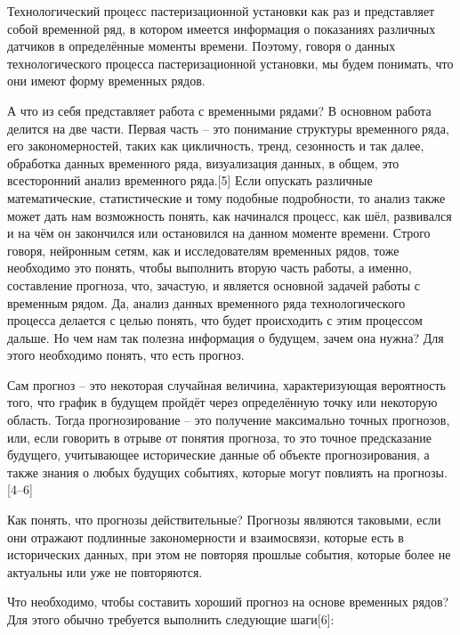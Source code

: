 {  \par \redline Технологический процесс пастеризационной установки как раз и представляет собой временной ряд, в котором имеется информация о показаниях различных датчиков в определённые моменты времени. Поэтому, говоря о данных технологического процесса пастеризационной установки, мы будем понимать, что они имеют форму временных рядов.

  \par \redline А что из себя представляет работа с временными рядами? В основном работа делится на две части. Первая часть {--} это понимание структуры временного ряда, его закономерностей, таких как цикличность, тренд, сезонность и так далее, обработка данных временного ряда, визуализация данных, в общем, это всесторонний анализ временного ряда.[5] Если опускать различные математические, статистические и тому подобные подробности, то анализ также может дать нам возможность понять, как начинался процесс, как шёл, развивался и на чём он закончился или остановился на данном моменте времени.  Строго говоря, нейронным сетям, как и исследователям временных рядов, тоже необходимо это понять, чтобы выполнить вторую часть работы, а именно, составление прогноза, что, зачастую, и является основной задачей работы с временным рядом. Да, анализ данных временного ряда технологического процесса делается с целью понять, что будет происходить с этим процессом дальше. Но чем нам так полезна информация о будущем, зачем она нужна? Для этого необходимо понять, что есть прогноз.

  \par \redline Сам прогноз {--} это некоторая случайная величина, характеризующая вероятность того, что график в будущем пройдёт через определённую точку или некоторую область. Тогда прогнозирование {--} это получение максимально точных прогнозов, или, если говорить в отрыве от понятия прогноза, то это точное предсказание будущего, учитывающее исторические данные об объекте прогнозирования, а также знания о любых будущих событиях, которые могут повлиять на прогнозы.[4{--}6]

  \par \redline Как понять, что прогнозы действительные? Прогнозы являются таковыми, если они отражают подлинные закономерности и взаимосвязи, которые есть в исторических данных, при этом не повторяя прошлые события, которые более не актуальны или уже не повторяются.

  \par \redline Что необходимо, чтобы составить хороший прогноз на основе временных рядов? Для этого обычно требуется выполнить следующие шаги[6]:

}
